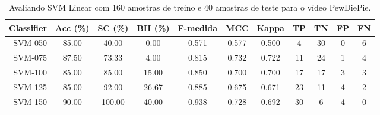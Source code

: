 \begin{table}[!htb]
\centering
\caption{Avaliando SVM Linear com 160 amostras de treino e 40 amostras de teste para o vídeo PewDiePie.}
\label{tab:linear-svm-PewDiePie}
\begin{tabular}{r|c|c|c|c|c|c|c|c|c|c}
\hline\hline
Classifier & Acc (\%) & SC (\%) & BH (\%) & F-medida & MCC & Kappa & TP & TN & FP & FN \\ \hline
SVM-050 & 85.00 & 40.00 & 0.00 & 0.571 & 0.577 & 0.500 & 4 & 30 & 0 & 6 \\ 
SVM-075 & 87.50 & 73.33 & 4.00 & 0.815 & 0.732 & 0.722 & 11 & 24 & 1 & 4 \\ 
SVM-100 & 85.00 & 85.00 & 15.00 & 0.850 & 0.700 & 0.700 & 17 & 17 & 3 & 3 \\ 
SVM-125 & 85.00 & 92.00 & 26.67 & 0.885 & 0.675 & 0.671 & 23 & 11 & 4 & 2 \\ 
SVM-150 & 90.00 & 100.00 & 40.00 & 0.938 & 0.728 & 0.692 & 30 & 6 & 4 & 0 \\ 
\hline\hline
\end{tabular}
\end{table}
